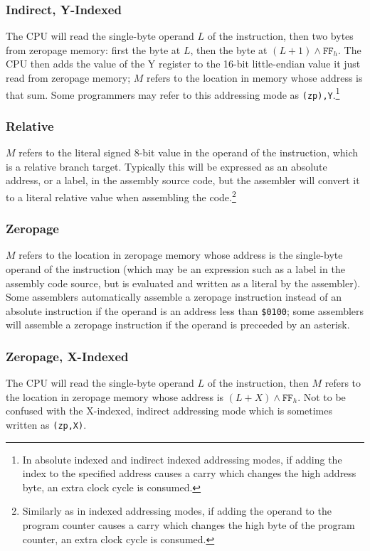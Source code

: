 \documentclass[12pt]{{memoir}}
\begin{document}
\subsubsection{Indirect, Y-Indexed}
The CPU will read the single-byte operand $L$ of the instruction, then two bytes from zeropage memory: first the byte at $L$, then the byte at $(L + 1) \wedge \texttt{FF}_h$. The CPU then adds the value of the Y register to the 16-bit little-endian value it just read from zeropage memory; $M$ refers to the location in memory whose address is that sum. Some programmers may refer to this addressing mode as \texttt{(zp),Y}.\footnote{\label{idxpagebdyfootnote}In absolute indexed and indirect indexed addressing modes, if adding the index to the specified address causes a carry which changes the high address byte, an extra clock cycle is consumed.}

\subsubsection{Relative}
$M$ refers to the literal signed 8-bit value in the operand of the instruction, which is a relative branch target. Typically this will be expressed as an absolute address, or a label, in the assembly source code, but the assembler will convert it to a literal relative value when assembling the code.\footnote{\label{relpagebdyfootnote}Similarly as in indexed addressing modes, if adding the operand to the program counter causes a carry which changes the high byte of the program counter, an extra clock cycle is consumed.}

\subsubsection{Zeropage}
$M$ refers to the location in zeropage memory whose address is the single-byte operand of the instruction (which may be an expression such as a label in the assembly code source, but is evaluated and written as a literal by the assembler). Some assemblers automatically assemble a zeropage instruction instead of an absolute instruction if the operand is an address less than \texttt{\$0100}; some assemblers will assemble a zeropage instruction if the operand is preceeded by an asterisk.

\subsubsection{Zeropage, X-Indexed}
The CPU will read the single-byte operand $L$ of the instruction, then $M$ refers to the location in zeropage memory whose address is $(L + X) \wedge \texttt{FF}_h$. Not to be confused with the X-indexed, indirect addressing mode which is sometimes written as \texttt{(zp,X)}.
\end{document}
